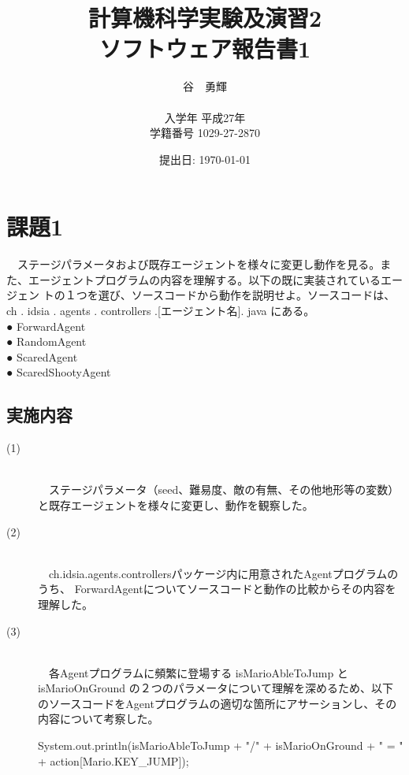 \documentclass[a4j]{jarticle}
\begin{document}
\title{計算機科学実験及演習2 \\ \bf ソフトウェア報告書1}
\author{谷　勇輝 \\ \\入学年 平成27年 \\ 学籍番号 1029-27-2870}
\date{提出日: \today} %
\maketitle

\section{課題1}
　ステージパラメータおよび既存エージェントを様々に変更し動作を見る。また、エージェントプログラムの内容を理解する。以下の既に実装されているエージェン
トの１つを選び、ソースコードから動作を説明せよ。ソースコードは、ch . idsia . agents . controllers .[エージェント名]. java にある。\\
● ForwardAgent \\
● RandomAgent \\
● ScaredAgent \\
● ScaredShootyAgent \\
\subsection{実施内容}
\begin{description}
\item[(1)]~\\
　ステージパラメータ（seed、難易度、敵の有無、その他地形等の変数）と既存エージェントを様々に変更し、動作を観察した。
\item[(2)]~\\
　ch.idsia.agents.controllersパッケージ内に用意されたAgentプログラムのうち、
ForwardAgentについてソースコードと動作の比較からその内容を理解した。
\item[(3)]~\\
　各Agentプログラムに頻繁に登場する isMarioAbleToJump と isMarioOnGround の２つのパラメータについて理解を深めるため、以下のソースコードをAgentプログラムの適切な箇所にアサーションし、その内容について考察した。
\begin{screen}
System.out.println(isMarioAbleToJump + "/" + isMarioOnGround + " = " + action[Mario.KEY\_JUMP]);
\end{screen}
\end{description}
\end{document}
